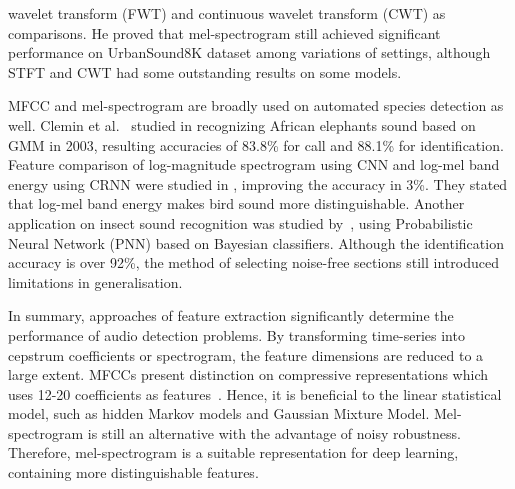 wavelet transform (FWT) and continuous wavelet transform
(CWT) as comparisons. He proved that mel-spectrogram still achieved significant performance on UrbanSound8K dataset among variations of settings, although STFT and CWT had some outstanding results on some models.\par
MFCC and mel-spectrogram are broadly used on automated species detection as well. Clemin et al.~\cite{clemins2003application} studied in recognizing African elephants sound based on GMM in 2003, resulting accuracies of 83.8\% for call and 88.1\% for identification.
Feature comparison of log-magnitude spectrogram using CNN and log-mel band energy using CRNN were studied in \cite{cakir2017convolutional}, improving the accuracy in 3\%. They stated that log-mel band energy makes bird sound more distinguishable. Another application on insect sound recognition was studied by~\cite{le2011insect}, using Probabilistic Neural Network (PNN) based on Bayesian classifiers. Although the identification accuracy is over 92\%, the method of selecting noise-free sections still introduced limitations in generalisation.

In summary, approaches of feature extraction significantly determine the performance of audio detection problems. By transforming time-series into cepstrum coefficients or spectrogram, the feature dimensions are reduced to a large extent. MFCCs present distinction on compressive representations which uses 12-20 coefficients as features~\cite{lippens2004comparison,le2011insect,clemins2003application}. Hence, it is beneficial to the linear statistical model, such as hidden Markov models and Gaussian Mixture Model. Mel-spectrogram is still an alternative with the advantage of noisy robustness. Therefore, mel-spectrogram is a suitable representation for deep learning, containing more distinguishable features.
